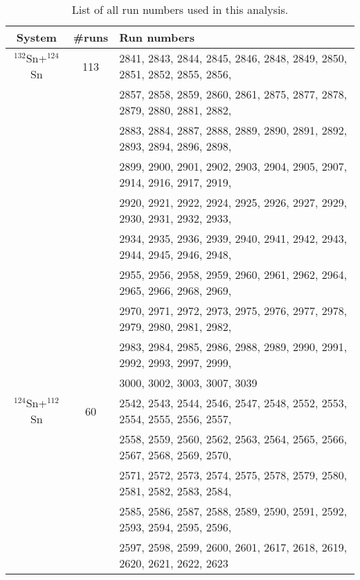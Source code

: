 \newcommand{\hsn}{$^{132}$Sn+$^{124}$Sn}
\newcommand{\mhsn}{$^{124}$Sn+$^{112}$Sn}
\newcommand{\mlsn}{$^{112}$Sn+$^{124}$Sn}
\newcommand{\lsn}{$^{108}$Sn+$^{112}$Sn}


\begin{table}[!htb]
  \begin{center}
    \begin{tabular}{ccl}
      \hline
      System & \#runs & Run numbers \\
      \hline\hline
      \hsn & 113 & 2841, 2843, 2844, 2845, 2846, 2848, 2849, 2850, 2851, 2852, 2855, 2856, \\
      & & 2857, 2858, 2859, 2860, 2861, 2875, 2877, 2878, 2879, 2880, 2881, 2882, \\
      & & 2883, 2884, 2887, 2888, 2889, 2890, 2891, 2892, 2893, 2894, 2896, 2898, \\
      & & 2899, 2900, 2901, 2902, 2903, 2904, 2905, 2907, 2914, 2916, 2917, 2919, \\
      & & 2920, 2921, 2922, 2924, 2925, 2926, 2927, 2929, 2930, 2931, 2932, 2933, \\
      & & 2934, 2935, 2936, 2939, 2940, 2941, 2942, 2943, 2944, 2945, 2946, 2948, \\
      & & 2955, 2956, 2958, 2959, 2960, 2961, 2962, 2964, 2965, 2966, 2968, 2969, \\
      & & 2970, 2971, 2972, 2973, 2975, 2976, 2977, 2978, 2979, 2980, 2981, 2982, \\
      & & 2983, 2984, 2985, 2986, 2988, 2989, 2990, 2991, 2992, 2993, 2997, 2999, \\
      & & 3000, 3002, 3003, 3007, 3039 \\
      \hline
      \mhsn & 60 & 2542, 2543, 2544, 2546, 2547, 2548, 2552, 2553, 2554, 2555, 2556, 2557, \\
      & & 2558, 2559, 2560, 2562, 2563, 2564, 2565, 2566, 2567, 2568, 2569, 2570, \\
      & & 2571, 2572, 2573, 2574, 2575, 2578, 2579, 2580, 2581, 2582, 2583, 2584, \\
      & & 2585, 2586, 2587, 2588, 2589, 2590, 2591, 2592, 2593, 2594, 2595, 2596, \\
      & & 2597, 2598, 2599, 2600, 2601, 2617, 2618, 2619, 2620, 2621, 2622, 2623  \\
      \hline
            \end{tabular}
    \caption{List of all run numbers used in this analysis. \label{tb:runList}}
  \end{center}
\end{table}

